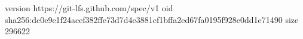 version https://git-lfs.github.com/spec/v1
oid sha256:dc0e9e1f24acef382ffe73d7d4e3881cf1bffa2ed67fa0195f928e0dd1e71490
size 296622
